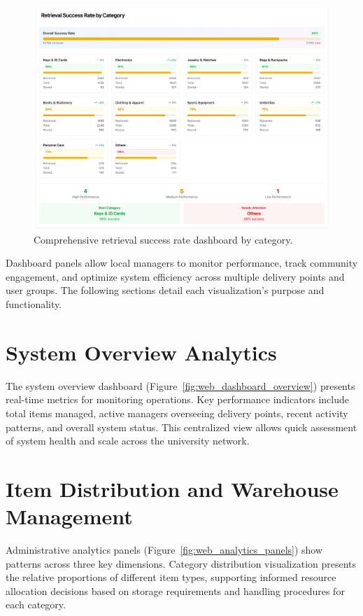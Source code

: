 \begin{figure}[h]
    \centering
    \includegraphics[width=\textwidth]{figs/appendix/web/6.png}
    \caption{Comprehensive retrieval success rate dashboard by category.}
    \label{fig:web_success_rates}
\end{figure}

Dashboard panels allow local managers to monitor performance, track community engagement, and optimize system efficiency across multiple delivery points and user groups. The following sections detail each visualization's purpose and functionality.

\section{System Overview Analytics} \label{section:system_overview}

The system overview dashboard (Figure~\ref{fig:web_dashboard_overview}) presents real-time metrics for monitoring operations. Key performance indicators include total items managed, active managers overseeing delivery points, recent activity patterns, and overall system status. This centralized view allows quick assessment of system health and scale across the university network.

\section{Item Distribution and Warehouse Management} \label{section:item_distribution}

Administrative analytics panels (Figure~\ref{fig:web_analytics_panels}) show patterns across three key dimensions. Category distribution visualization presents the relative proportions of different item types, supporting informed resource allocation decisions based on storage requirements and handling procedures for each category.

